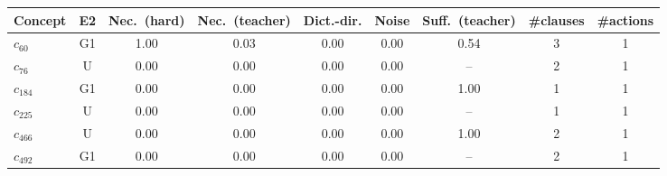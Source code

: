 \begin{tabular}{lcccccccc}
\toprule
Concept & E2 & Nec.\ (hard) & Nec.\ (teacher) & Dict.-dir. & Noise & Suff.\ (teacher) & \#clauses & \#actions \\
\midrule
$c_{60}$ & G1 & 1.00 & 0.03 & 0.00 & 0.00 & 0.54 & 3 & 1 \\
$c_{76}$ & U & 0.00 & 0.00 & 0.00 & 0.00 & -- & 2 & 1 \\
$c_{184}$ & G1 & 0.00 & 0.00 & 0.00 & 0.00 & 1.00 & 1 & 1 \\
$c_{225}$ & U & 0.00 & 0.00 & 0.00 & 0.00 & -- & 1 & 1 \\
$c_{466}$ & U & 0.00 & 0.00 & 0.00 & 0.00 & 1.00 & 2 & 1 \\
$c_{492}$ & G1 & 0.00 & 0.00 & 0.00 & 0.00 & -- & 2 & 1 \\
\bottomrule
\end{tabular}
